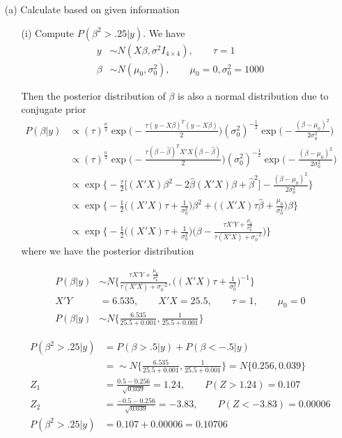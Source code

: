 \begin{itemize}

\item[(a)] Calculate based on given information 

\begin{itemize}
\item[(i)] Compute $P(\beta^2 > .25| y)$.
We have
\begin{align*}
y & \sim N(X \beta, \sigma^2 I_{4 \times 4}), \qquad \tau = 1 \\
\beta & \sim N(\mu_0, \sigma_0^2), \qquad \mu_0 = 0,  \sigma_0^2= 1000
\end{align*}	

Then the posterior distribution of $\beta$ is also a normal distribution due to conjugate prior
\begin{align*}
P(\beta | y) & \propto (\tau)^{\frac{n}{2}} \exp \Big(- \frac{\tau (y- X\beta)^T (y- X\beta)}{2} \Big) (\sigma_0^2)^{-\frac{1}{2}} \exp \Big( -\frac{(\beta - \mu_0)^2}{2 \sigma_0^2} \Big) \\
& \propto (\tau)^{\frac{n}{2}} \exp \Big(- \frac{\tau (\beta- \hat\beta)^T X'X (\beta- \hat\beta)}{2} \Big) (\sigma_0^2)^{-\frac{1}{2}} \exp \Big( -\frac{(\beta - \mu_0)^2}{2 \sigma_0^2} \Big) \\
& \propto \exp \Bigg \{ -\frac{\tau}{2} \Big[ (X'X) \beta^2 - 2 \hat{\beta} (X'X) \beta + \hat{\beta}^2 \Big] - \frac{(\beta - \mu_0)^2}{2 \sigma_0^2} \Bigg\} \\
& \propto  \exp \Bigg \{ -\frac{1}{2} \Big( (X'X)\tau + \frac{1}{\sigma_0^2}  \Big) \beta^2  + \Big( (X'X)\tau \hat{\beta} + \frac{\mu_0}{\sigma_0^2} \Big) \beta \Bigg\} \\
& \propto \exp \Bigg \{ -\frac{1}{2} \Big( (X'X)\tau + \frac{1}{\sigma_0^2}  \Big) \Bigg( \beta - \frac{\tau X'Y + \frac{\mu_0}{\sigma_0^2}}{\tau (X'X) + \sigma_0^{-2}}\Bigg) \Bigg\}
\end{align*}	
where we have the posterior distribution

\begin{align*}
P(\beta | y) & \sim N \Bigg \{ \frac{\tau X'Y + \frac{\mu_0}{\sigma_0^2}}{\tau (X'X) + \sigma_0^{-2}}, \Big( (X'X)\tau + \frac{1}{\sigma_0^2}  \Big)^{-1}  \Bigg\} \\
X'Y &= 6.535, \qquad X'X = 25.5,\qquad \tau = 1,\qquad \mu_0 = 0 \\
P(\beta | y) & \sim N \{ \frac{6.535}{25.5 + 0.001}, \frac{1}{25.5+0.001} \} 
\end{align*}

\begin{align*}
P(\beta^2 > .25| y) &=  P(\beta > .5| y) + P(\beta < -.5| y) \\
&= \sim N \{ \frac{6.535}{25.5 + 0.001}, \frac{1}{25.5+0.001} \}  = N \{ 0.256, 0.039 \} \\
Z_{1} &= \frac{0.5 - 0.256}{\sqrt{0.039}} = 1.24, \qquad P(Z > 1.24) = 0.107\\
Z_{2} &= \frac{-0.5 - 0.256}{\sqrt{0.039}} = -3.83, \qquad P(Z < -3.83) = 0.00006\\
P(\beta^2 > .25| y) &= 0.107 + 0.00006 = 0.10706
\end{align*}


\end{itemize}
\end{itemize}
